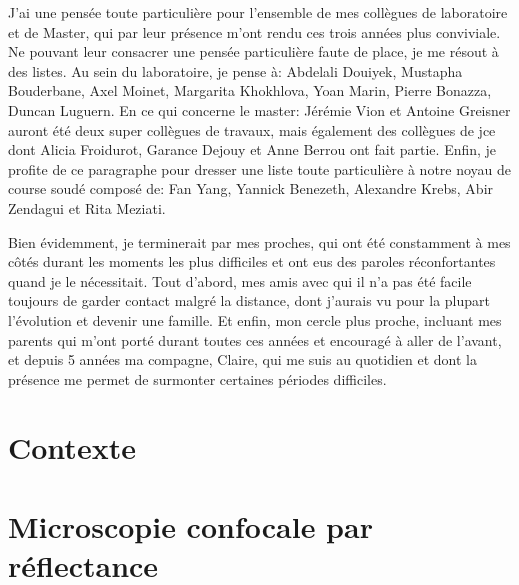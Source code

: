 \documentclass[english,standardlists]{spimubphdthesis}
\begin{document}
J'ai une pensée toute particulière pour l'ensemble de mes collègues de laboratoire et de Master, qui par leur présence m'ont rendu ces trois années plus conviviale. Ne pouvant leur consacrer une pensée particulière faute de place, je me résout à des listes. Au sein du laboratoire, je pense à: Abdelali Douiyek, Mustapha Bouderbane, Axel Moinet, Margarita Khokhlova, Yoan Marin, Pierre Bonazza, Duncan Luguern. En ce qui concerne le master: Jérémie Vion et Antoine Greisner auront été deux super collègues de travaux, mais également des collègues de \gls{jce} dont Alicia Froidurot, Garance Dejouy et Anne Berrou ont fait partie. Enfin, je profite de ce paragraphe pour dresser une liste toute particulière à notre noyau de course soudé composé de: Fan Yang, Yannick Benezeth, Alexandre Krebs, Abir Zendagui et Rita Meziati.\par

Bien évidemment, je terminerait par mes proches, qui ont été constamment à mes côtés durant les moments les plus difficiles et ont eus des paroles réconfortantes quand je le nécessitait. Tout d'abord, mes amis avec qui il n'a pas été facile toujours de garder contact malgré la distance, dont j'aurais vu pour la plupart l'évolution et devenir une famille. Et enfin, mon cercle plus proche, incluant mes parents qui m'ont porté durant toutes ces années et encouragé à aller de l'avant, et depuis 5 années ma compagne, Claire, qui me suis au quotidien et dont la présence me permet de surmonter certaines périodes difficiles.\par
		
\tableofcontents

\mainmatter



\part{Contexte}
\label{part:contexte}




\part{Microscopie confocale par réflectance}
\label{part:microscopie}



\end{document}
